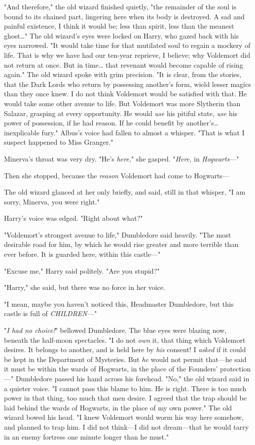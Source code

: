 "And therefore," the old wizard finished quietly, "the remainder of the soul is bound to its chained part, lingering here when its body is destroyed. A sad and painful existence, I think it would be; less than spirit, less than the meanest ghost{\ldots}" The old wizard's eyes were locked on Harry, who gazed back with his eyes narrowed. "It would take time for that mutilated soul to regain a mockery of life. That is why we have had our ten-year reprieve, I believe; why Voldemort did not return at once. But in time{\ldots} that revenant would become capable of rising again." The old wizard spoke with grim precision. "It is clear, from the stories, that the Dark Lords who return by possessing another's form, wield lesser magics than they once knew. I do not think Voldemort would be satisfied with that. He would take some other avenue to life. But Voldemort was more Slytherin than Salazar, grasping at every opportunity. He would \emph{use} his pitiful state, \emph{use} his power of possession, if he had reason. If he could benefit by another's{\ldots} inexplicable fury." Albus's voice had fallen to almost a whisper. "That is what I suspect happened to Miss Granger."

Minerva's throat was very dry. "He's \emph{here,}" she gasped. "\emph{Here,} in \emph{Hogwarts}---"

Then she stopped, because the \emph{reason} Voldemort had come to Hogwarts---

The old wizard glanced at her only briefly, and said, still in that whisper, "I am sorry, Minerva, you were right."

Harry's voice was edged. "Right about what?"

"Voldemort's strongest avenue to life," Dumbledore said heavily. "The most desirable road for him, by which he would rise greater and more terrible than ever before. It is guarded here, within this castle---"

"Excuse me," Harry said politely. "Are you stupid?"

"Harry," she said, but there was no force in her voice.

"I mean, maybe you haven't noticed this, Headmaster Dumbledore, but this castle is full of \emph{CHILDREN---}"

"\emph{I had no choice!}" bellowed Dumbledore. The blue eyes were blazing now, beneath the half-moon spectacles. "I do not \emph{own} it, that thing which Voldemort desires. It belongs to another, and is held here by \emph{his} consent! I \emph{asked} if it could be kept in the Department of Mysteries. But \emph{he} would not permit that---he said it must be within the wards of Hogwarts, in the place of the Founders' protection---" Dumbledore passed his hand across his forehead. "No," the old wizard said in a quieter voice. "I cannot pass this blame to him. He is right. There is too much power in that thing, too much that men desire. I agreed that the trap should be laid behind the wards of Hogwarts, in the place of my own power." The old wizard bowed his head. "I knew Voldemort would worm his way here somehow, and planned to trap him. I did not think---I did not dream---that he would tarry in an enemy fortress one minute longer than he must."

